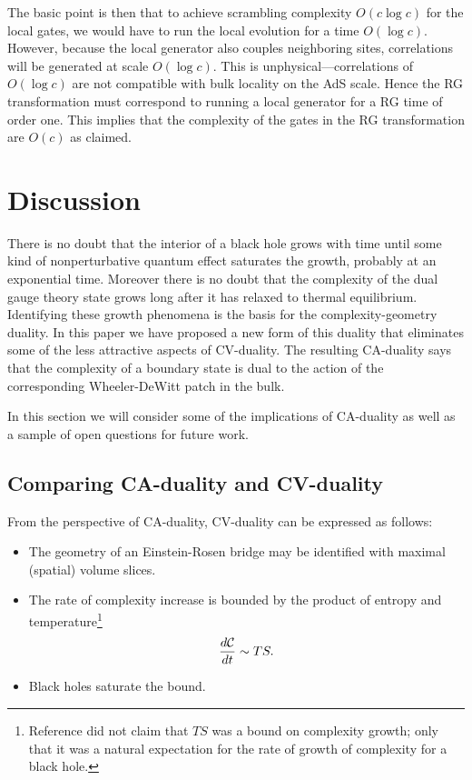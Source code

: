 \documentclass[12pt]{article}
\numberwithin{equation}{section}
\newcommand{\be}{\begin{equation}}
\newcommand{\ee}{\end{equation}}
\def\CC{{\cal C}}
\begin{document}
The basic point is then that to achieve scrambling complexity   $O(c \log c)$ for the local gates, we would have to run the local evolution for a time $O(\log c)$. However, because the local generator also couples neighboring sites, correlations will be generated at scale $O(\log c)$. This is unphysical---correlations of $O(\log c)$ are not compatible with bulk locality on the AdS scale. Hence the RG transformation must correspond to running a local generator for a RG time of order one. This implies that the complexity of the gates in the RG transformation are $O(c)$ as claimed.




\section{Discussion}
\label{sec:discussion}

There is no doubt that the interior of a black hole grows with time until some kind of nonperturbative quantum effect saturates the growth, probably at an exponential time. Moreover there is no doubt that the complexity of the dual gauge theory state grows long after it has relaxed to thermal equilibrium. Identifying these growth phenomena is the basis for the complexity-geometry duality. In this paper we have proposed a new form of this duality that eliminates some of the less attractive aspects of CV-duality. The resulting CA-duality says that
 the complexity of a boundary state is dual to the action of the corresponding Wheeler-DeWitt patch in the bulk.

 In this section we will consider some of the implications of CA-duality as well as a sample of open questions for future work.

\subsection{Comparing CA-duality and CV-duality}
\label{subsec:implications}

From the perspective of CA-duality, CV-duality \cite{complexityshocks} can be expressed as follows:
\begin{itemize}
\item[1)] The geometry of an Einstein-Rosen bridge may be identified with maximal (spatial) volume slices.

\item[2)] The rate of complexity increase is bounded by the product of entropy and temperature\footnote{Reference \cite{complexityshocks} did not claim that $TS$ was a bound on complexity growth; only that it was a natural expectation for the rate of growth of complexity for a black hole.}
\be
\frac{d\CC}{dt}  \sim TS.
\ee
\item[3)] Black holes saturate the bound.
\end{itemize}
\end{document}
